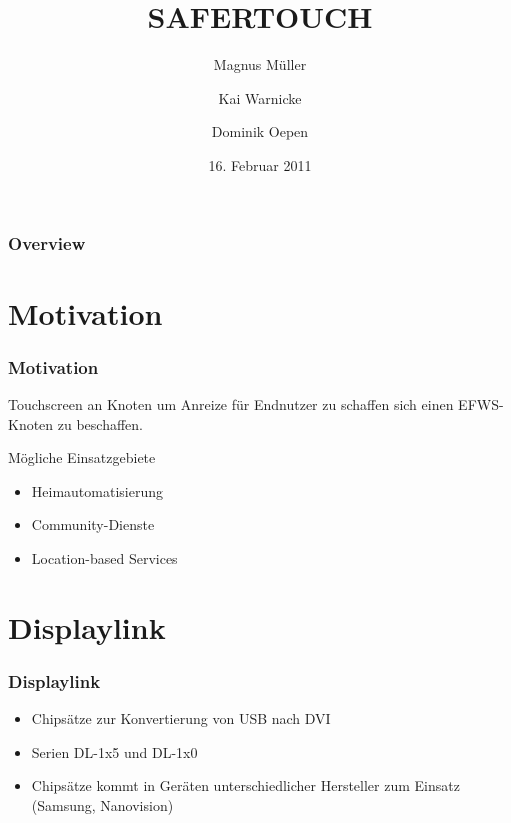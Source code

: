 \documentclass{beamer}
\title{SAFERTOUCH}
\institute[{Humboldt-Universität zu Berlin}]{\inst{}Humboldt-Universität zu Berlin}
\author[Magnus Müller \and Kai Warnicke \and Dominik Oepen]{Magnus Müller \and Kai Warnicke \and Dominik Oepen}
\date[16.02.2011]{16. Februar 2011}
\begin{document}
	\begin{frame}
		\titlepage
	\end{frame}

	\begin{frame}
		\frametitle{Overview}
		\tableofcontents
	\end{frame}	

  \section{Motivation}
	\begin{frame}
		\frametitle{Motivation}
		Touchscreen an Knoten um Anreize für Endnutzer zu schaffen sich einen EFWS-Knoten zu beschaffen.\\
		\begin{block}{Mögliche Einsatzgebiete}
			\begin{itemize}
				\item Heimautomatisierung
				\item Community-Dienste
				\item Location-based Services
			\end{itemize}
		\end{block}
	\end{frame}

	\section{Displaylink}
	
	\begin{frame}
		\frametitle{Displaylink}
		\begin{itemize}
			\item Chipsätze zur Konvertierung von USB nach DVI
			\item Serien DL-1x5 und DL-1x0
			\item Chipsätze kommt in Geräten unterschiedlicher Hersteller zum Einsatz 
        (Samsung, Nanovision)
		\end{itemize}	
	\end{frame}	
\end{document}
